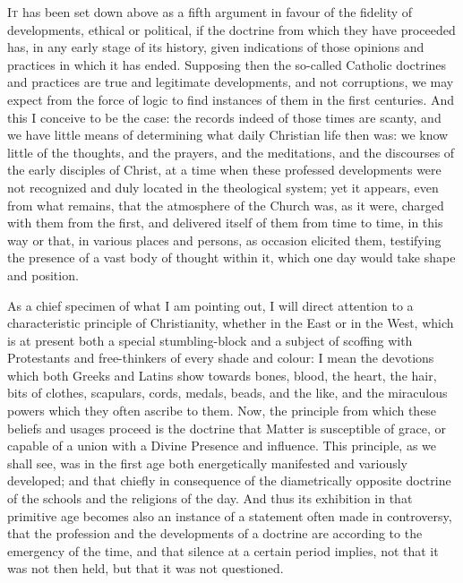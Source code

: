 
I\textsc{t} has been set down above as a fifth argument in favour of the
fidelity of developments, ethical or political, if the doctrine from
which they have proceeded has, in any early stage of its history,
given indications of those opinions and practices in which it has
ended. Supposing then the so-called Catholic doctrines and practices
are true and legitimate developments, and not corruptions, we may
expect from the force of logic to find instances of them in the first
centuries. And this I conceive to be the case: the records indeed of
those times are scanty, and we have little means of determining what
daily Christian life then was: we know little of the thoughts, and the
prayers, and the meditations, and the discourses of the early
disciples of Christ, at a time when these professed developments were
not recognized and duly located in the theological system; yet it
appears, even from what remains, that the atmosphere of the Church
was, as it were, charged with them from the first, and delivered
itself of them from time to time, in this way or that, in various
places and persons, as occasion elicited them, testifying the presence
of a vast body of thought within it, which one day would take shape
and position.


As a chief specimen of what I am pointing out, I will direct
attention to a characteristic principle of Christianity, whether in
the East or in the West, which is at present both a special
stumbling-block and a subject of scoffing with Protestants and
free-thinkers of every shade and colour: I mean the devotions which
both Greeks and Latins show towards bones, blood, the heart, the hair,
bits of clothes, scapulars, cords, medals, beads, and the like, and
the miraculous powers which they often ascribe to them. Now, the
principle from which these beliefs and usages proceed is the doctrine
that Matter is susceptible of grace, or capable of a union with a
Divine Presence and influence. This principle, as we shall see, was in
the first age both energetically manifested and variously developed;
and that chiefly in consequence of the diametrically opposite doctrine
of the schools and the religions of the day. And thus its exhibition
in that primitive age becomes also an instance of a statement often
made in controversy, that the profession and the developments of a
doctrine are according to the emergency of the time, and that silence
at a certain period implies, not that it was not then held, but that
it was not questioned.

